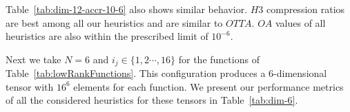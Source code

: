 \documentclass[runningheads]{llncs}
\begin{document}

\noindent Table~\ref{tab:dim-12-accr-10-6} also shows similar behavior. $H3$ compression ratios are best among all our heuristics and are similar to $OTTA$. $OA$ values of all heuristics are also within the prescribed limit of $10^{-6}$. 
  
\noindent Next we take $N=6$ and $i_j \in \{1,2 \cdots ,16\}$ for the functions of Table~\ref{tab:lowRankFunctions}. This configuration produces a $6$-dimensional tensor with $16^6$ elements for each function. We present our performance metrics of all the considered heuristics for these tensors in Table~\ref{tab:dim-6}.
\end{document}
